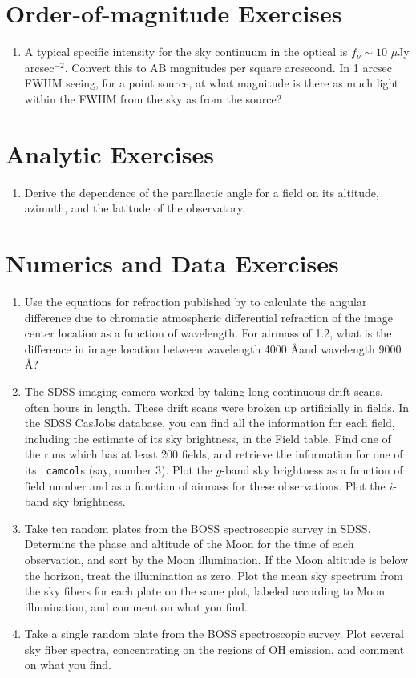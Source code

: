 \section{Order-of-magnitude Exercises}

\begin{enumerate} 
\item A typical specific intensity  for the sky continuum in the
    optical is $f_\nu \sim 10$ $\mu$Jy arcsec$^{-2}$. Convert this to
    AB magnitudes per square arcsecond. In 1 arcsec FWHM seeing, for a
    point source, at what magnitude is there as much light within the
    FWHM from the sky as from the source?
\end{enumerate} 

\section{Analytic Exercises}

\begin{enumerate}
\item Derive the dependence of the parallactic angle for a field on
    its altitude, azimuth, and the latitude of the observatory.
\end{enumerate}

\section{Numerics and Data Exercises}

\begin{enumerate}
\item Use the equations for refraction published by \citet{stone96a}
to calculate the angular difference due to chromatic atmospheric
    differential refraction of the image center location as a function
    of wavelength. For airmass of 1.2, what is the difference in image
    location between wavelength 4000 \AA and wavelength 9000 \AA?
\item The SDSS imaging camera worked by taking long continuous drift
scans, often hours in length. These drift scans were broken up
artificially in fields. In the SDSS CasJobs database, you can find all
the information for each field, including the estimate of its sky
brightness, in the Field table. Find one of the runs which has at
least 200 fields, and retrieve the information for one of its {\tt
camcol}s (say, number 3). Plot the $g$-band sky brightness as a
function of field number and as a function of airmass for these
observations. Plot the $i$-band sky brightness. 
\item Take ten random plates from the BOSS spectroscopic survey in
SDSS. Determine the phase and altitude of the Moon for the time of
each observation, and sort by the Moon illumination. If the Moon
altitude is below the horizon, treat the illumination as zero. Plot
the mean sky spectrum from the sky fibers for each plate on the same
plot, labeled according to Moon illumination, and comment on what you
find.
\item Take a single random plate from the BOSS spectroscopic
survey. Plot several sky fiber spectra, concentrating on the regions
of OH emission, and comment on what you find.
\end{enumerate}

